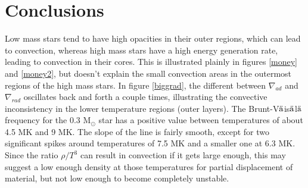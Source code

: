 \documentclass[12pt]{article}
\begin{document}
\section{Conclusions}
Low mass stars tend to have high opacities in their outer regions,
which can lead to convection, whereas high mass stars have a high
energy generation rate, leading to convection in their cores. This is
illustrated plainly in figures \ref{money} and \ref{money2}, but
doesn't explain the small convection areas in the outermost regions of
the high mass stars. In figure \ref{biggrad}, the different between
$\nabla_{ad}$ and $\nabla_{rad}$ oscillates back and forth a couple
times, illustrating the convective inconsistency in the lower
temperature regions (outer layers).
The Brunt-V$\ddot{\rm a}$is$\ddot{\rm a}$l$\ddot{\rm a}$
frequency for the 0.3 M$_{\odot}$ star has a
positive value between temperatures of about 4.5 MK and 9 MK.
The slope of the line is fairly smooth, except for two significant
spikes around temperatures of 7.5 MK and a smaller one at 6.3 MK.
Since the ratio $\rho/T^3$ can result in convection if it gets large
enough, this may suggest a low enough density at those temperatures
for partial displacement of material, but not low enough to become
completely unstable.


%
\end{document}
